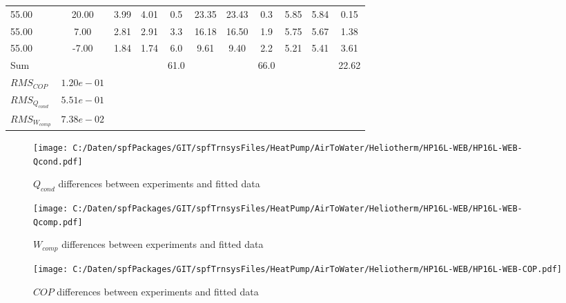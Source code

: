 \documentclass[english]{SPFShortReport}
\begin{document}
\begin{table}[!ht]
\begin{small}
\begin{center}
{\begin{tabular}{l | c c c c c c c c c c }
55.00  & 20.00 & 3.99 & 4.01 & 0.5 & 23.35 & 23.43 & 0.3 & 5.85 & 5.84 & 0.15\\ 
55.00  & 7.00 & 2.81 & 2.91 & 3.3 & 16.18 & 16.50 & 1.9 & 5.75 & 5.67 & 1.38\\ 
55.00  & -7.00 & 1.84 & 1.74 & 6.0 & 9.61 & 9.40 & 2.2 & 5.21 & 5.41 & 3.61\\ 
\hline 
 Sum &  & &  & 61.0 &  &  & 66.0 & &  & 22.62\\ 
\hline 
 $RMS_{COP}$ & $1.20e-01$ \\ 
 $RMS_{Q_{cond}}$ & $5.51e-01$ \\ 
 $RMS_{W_{comp}}$ & $7.38e-02$ \\ 
\hline
\hline
\end{tabular}
}
\label{ErrorsTable}
\end{center}
\end{small}
\end{table}
\begin{figure}[!ht]
\begin{center}
\texttt{[image: C:/Daten/spfPackages/GIT/spfTrnsysFiles/HeatPump/AirToWater/Heliotherm/HP16L-WEB/HP16L-WEB-Qcond.pdf]}
\caption{$Q_{cond}$ differences between experiments and fitted data}
\label{QcongFig}
\end{center}
\end{figure}
\begin{figure}[!ht]
\begin{center}
\texttt{[image: C:/Daten/spfPackages/GIT/spfTrnsysFiles/HeatPump/AirToWater/Heliotherm/HP16L-WEB/HP16L-WEB-Qcomp.pdf]}
\caption{$W_{comp}$ differences between experiments and fitted data}
\label{QcompFig}
\end{center}
\end{figure}
\begin{figure}[!ht]
\begin{center}
\texttt{[image: C:/Daten/spfPackages/GIT/spfTrnsysFiles/HeatPump/AirToWater/Heliotherm/HP16L-WEB/HP16L-WEB-COP.pdf]}
\caption{$COP$ differences between experiments and fitted data}
\label{COPFig}
\end{center}
\end{figure}
\end{document}
